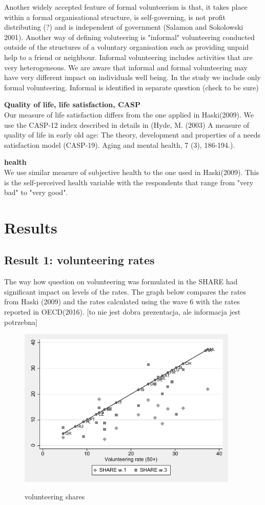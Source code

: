 \documentclass[10pt, letterpaper]{article}
\begin{document}
\begin{spacing}{1.4}
Another widely accepted feature of formal volunteerism is that, it takes place within a formal organisational structure, is self-governing, is not profit distributing (?) and is independent of government (Salamon and Sokolowski 2001). Another way of defining voluteering is "informal" volunteering conducted outside of the structures of a voluntary organisation such as providing unpaid help to a friend or neighbour. Informal volunteering includes activities that are very heterogeneous. We are aware that informal and formal volunteering may have very different impact on individuals well being. In the study we include only formal volunteering. Informal is identified in separate question (check to be sure)

\textbf{Quality of life, life satisfaction, CASP} \\
Our measure of life satisfaction differs from the one applied in Haski(2009). We use the CASP-12 index described in details in (Hyde, M. (2003) A measure of quality of life in early old age: The theory, development and properties of a needs satisfaction model (CASP-19). Aging and mental health, 7 (3), 186-194.).


\textbf{health} \\
We use similar measure of subjective health to the one used in Haski(2009). This is the self-perceived health variable with the respondents that range from "very bad" to "very good". 


\section{Results}

\subsection{Result 1: volunteering rates}

The way how question on volunteering was formulated in the SHARE had significant impact on levels of the rates. The graph below compares the rates from Haski (2009) and the rates calculated using the wave 6 with the rates reported in OECD(2016). [to nie jest dobra prezentacja, ale informacja jest potrzebna]

\begin{figure}[H]
 \includegraphics[height=3in]{oecd_oecdShare16.pdf}
 \centering
 \label{fig:volshares}
\caption{volunteering shares}
\end{figure}


\end{spacing}
\end{document}
